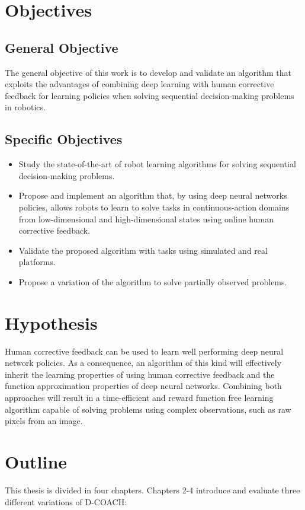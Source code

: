 \begin{intro}
\section{Objectives}
\subsection{General Objective}
The general objective of this work is to develop and validate an algorithm that exploits the advantages of combining deep learning with human corrective feedback for learning policies when solving sequential decision-making problems in robotics. 

\subsection{Specific Objectives}

\begin{itemize}
    \item Study the state-of-the-art of robot learning algorithms for solving sequential decision-making problems.
    \item Propose and implement an algorithm that, by using deep neural networks policies, allows robots to learn to solve tasks in continuous-action domains from low-dimensional and high-dimensional states using online human corrective feedback. 
    \item Validate the proposed algorithm with tasks using simulated and real platforms.
    \item Propose a variation of the algorithm to solve partially observed problems.
\end{itemize}

\section{Hypothesis}
Human corrective feedback can be used to learn well performing deep neural network policies. As a consequence, an algorithm of this kind will effectively inherit the learning properties of using human corrective feedback and the function approximation properties of deep neural networks. Combining both approaches will result in a time-efficient and reward function free learning algorithm capable of solving problems using complex observations, such as raw pixels from an image.

\section{Outline}
This thesis is divided in four chapters. Chapters 2-4 introduce and evaluate three different variations of D-COACH:


\end{intro}
